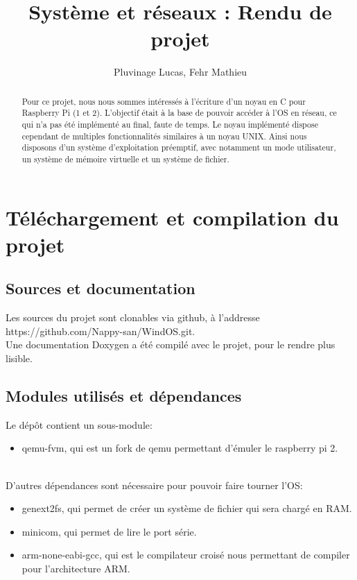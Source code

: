 \documentclass[a4paper]{article}
\author{Pluvinage Lucas, Fehr Mathieu}
\title{Système et réseaux : Rendu de projet}
\begin{document}
\maketitle

\begin{abstract}
  Pour ce projet, nous nous sommes intéressés à l'écriture d'un noyau en C pour
  Raspberry Pi (1 et 2). L'objectif était à la base de pouvoir accéder à l'OS en
  réseau, ce qui n'a pas été implémenté au final, faute de temps. Le noyau
  implémenté dispose cependant de multiples fonctionnalités similaires à un noyau
  UNIX. Ainsi nous disposons d'un système d'exploitation préemptif, avec notamment
  un mode utilisateur, un système de mémoire virtuelle et un système de fichier.
\end{abstract}

\tableofcontents
\newpage

\section{Téléchargement et compilation du projet}
\subsection{Sources et documentation}

Les sources du projet sont clonables via github, à l'addresse https://github.com/Nappy-san/WindOS.git.\\

Une documentation Doxygen a été compilé avec le projet, pour le rendre plus lisible.

\subsection{Modules utilisés et dépendances}

Le dépôt contient un sous-module:
\begin{itemize}
\item qemu-fvm, qui est un fork de qemu permettant d'émuler le raspberry pi 2.
\end{itemize}
\ \\
D'autres dépendances sont nécessaire pour pouvoir faire tourner l'OS:
\begin{itemize}
\item genext2fs, qui permet de créer un système de fichier qui sera chargé en RAM.
\item minicom, qui permet de lire le port série.
\item arm-none-eabi-gcc, qui est le compilateur croisé nous permettant de compiler pour
l'architecture ARM.
\end{itemize}
\end{document}
